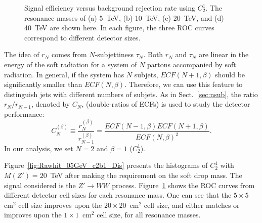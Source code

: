 \begin{figure}
\begin{center}
\end{center}
\caption{Signal efficiency versus background rejection rate using $C_{2}^{1}$. 
The resonance masses of (a) 5~TeV, (b) 10~TeV, (c) 20~TeV, and (d) 40~TeV are shown 
here. In each figure, the three ROC curves correspond to different detector 
sizes.}
\label{fig:Rawhit_05GeV_c2b1_ROC}
\end{figure}



The idea of $r_N$ comes from $N$-subjettiness $\tau_N$. Both $r_N$ and $\tau_N$ 
are linear in the energy of the soft radiation for a system of $N$ partons  accompanied 
by  soft radiation. In general, if the system has $N$ subjets, $ECF(N+1,\beta)$ 
should be significantly smaller than $ECF(N,\beta)$. Therefore, we can use this
 feature to distinguish jets with different numbers  of subjets. 
As in Sect.~\ref{sec:nsub}, the ratio $r_N/r_{N-1}$, denoted by $C_N$, 
(double-ratios of ECFs) is used to study the detector performance: 
\begin{equation}
C_{N}^{(\beta)}\equiv\frac{r_{N}^{(\beta)}}{r_{N-1}^{(\beta)}}=\frac{ECF(N-1,\beta)ECF(N+1,\beta)}{ECF(N,\beta)^2}.
\end{equation}
In our analysis, we set $N=2$ and $\beta=1$ ($C_2^1$).

Figure~\ref{fig:Rawhit_05GeV_c2b1_Dis} presents the histograms of $C_{2}^{1}$ 
with $M(Z')=20$~TeV after making the requirement on the soft drop mass. 
The signal considered is the $Z' \rightarrow WW$ process. 
Figure~\ref{fig:Rawhit_05GeV_c2b1_ROC} shows the ROC curves from different 
detector cell sizes for each resonance mass. One can see that 
the $5 \times 5$~$\mathrm{cm}^2$ cell size improves upon the $20 \times 20$~$\mathrm{cm}^2$ cell size, and either matches or improves upon the $1 \times 1$~$\mathrm{cm}^2$ cell size,
   for all resonance masses. 


